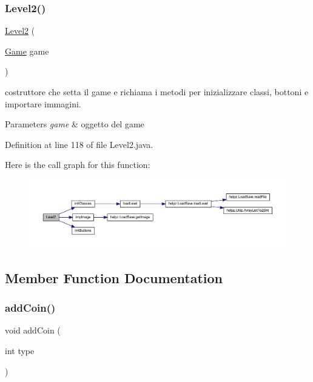 \subsubsection{\texorpdfstring{Level2()}{Level2()}}
{\footnotesize\ttfamily \hyperlink{classscenes_1_1_level2}{Level2} (\begin{DoxyParamCaption}\item[{\hyperlink{classprogetto_1_1_game}{Game}}]{game }\end{DoxyParamCaption})}



costruttore che setta il game e richiama i metodi per inizializzare classi, bottoni e importare immagini. 


\begin{DoxyParams}{Parameters}
{\em game} & oggetto del game \\
\hline
\end{DoxyParams}


Definition at line 118 of file Level2.\+java.

Here is the call graph for this function\+:
\nopagebreak
\begin{figure}[H]
\begin{center}
\leavevmode
\includegraphics[width=350pt]{classscenes_1_1_level2_a53060fc6a453b337e408bd89a86e32af_cgraph}
\end{center}
\end{figure}


\subsection{Member Function Documentation}
\mbox{\label{classscenes_1_1_level2_a9f0f7dc28e596d2ebcd06e27ef05d9fd}} 
\subsubsection{\texorpdfstring{add\+Coin()}{addCoin()}}
{\footnotesize\ttfamily void add\+Coin (\begin{DoxyParamCaption}\item[{int}]{type }\end{DoxyParamCaption})}



